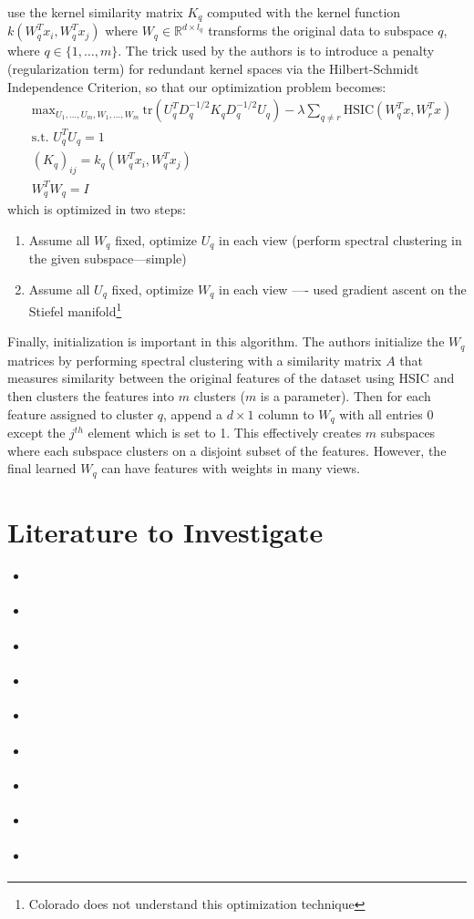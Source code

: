 \documentclass{article}
\numberwithin{equation}{section}
\numberwithin{thm}{section}
\begin{document}
\citet{Niu2010} use the kernel similarity matrix $K_q$ computed with the kernel function $k(W^T_q x_i, W^T_q x_j)$ where $W_q \in \mathbb{R}^{d\times l_q}$ transforms the original data to subspace $q$, where $q \in \{1, \ldots, m\}$. The trick used by the authors is to introduce a penalty (regularization term) for redundant kernel spaces via the Hilbert-Schmidt Independence Criterion, so that our optimization problem becomes:
\begin{align*}
& \text{max}_{U_1, \ldots, U_m, W_1, \ldots, W_m}  ~\text{tr}(U_q^TD_q^{-1/2}K_qD_q^{-1/2}U_q) - \lambda \sum_{q \neq r} \text{HSIC}(W_q^Tx, W_r^Tx)\\
& \text{s.t. } U_q^TU_q = 1 \\
& (K_q)_{ij} = k_q(W_q^Tx_i,W_q^Tx_j) \\ 
& W_q^TW_q = I
\end{align*}
which is optimized in two steps:
\begin{enumerate}
\item Assume all $W_q$ fixed, optimize $U_q$ in each view (perform spectral clustering in the given subspace---simple)
\item Assume all $U_q$ fixed, optimize $W_q$ in each view ---- used gradient ascent on the Stiefel manifold\footnote{Colorado does not understand this optimization technique}
\end{enumerate}

Finally, initialization is important in this algorithm. The authors initialize the $W_q$ matrices by performing spectral clustering with a similarity matrix $A$ that measures similarity between the original features of the dataset using HSIC and then clusters the features into $m$ clusters ($m$ is a parameter). Then for each feature assigned to cluster $q$, append a $d \times 1$ column to $W_q$ with all entries 0 except the $j^{th}$ element which is set to 1. This effectively creates $m$ subspaces where each subspace clusters on a disjoint subset of the features. However, the final learned $W_q$ can have features with weights in many views.




\section{Literature to Investigate}
\begin{itemize}
\item \citet{Griffiths2011}
\item \citet{Luxburg2007}
\item \citet{Cui2007}
\item \citet{Niu2010}
\item \citet{Niu2011}
\item \citet{Niu2012}
\item \citet{Higham2004}
\item \citet{yan2009fast}
\item \citet{jain2008simultaneous}
\end{itemize}

\small{


}
\end{document}

